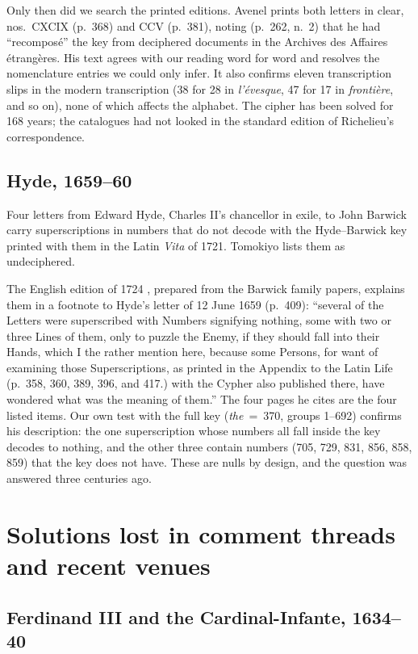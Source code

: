 \documentclass[11pt]{article}
\begin{document}
Only then did we search the printed editions. Avenel  prints both letters in clear, nos.~CXCIX (p.~368) and CCV (p.~381), noting (p.~262, n.~2) that he had ``recompos\'e'' the key from deciphered documents in the Archives des Affaires \'etrang\`eres. His text agrees with our reading word for word and resolves the nomenclature entries we could only infer. It also confirms eleven transcription slips in the modern transcription (38 for 28 in \emph{l'\'evesque}, 47 for 17 in \emph{fronti\`ere}, and so on), none of which affects the alphabet. The cipher has been solved for 168 years; the catalogues had not looked in the standard edition of Richelieu's correspondence.

\subsection{Hyde, 1659--60}

Four letters from Edward Hyde, Charles II's chancellor in exile, to John Barwick carry superscriptions in numbers that do not decode with the Hyde--Barwick key printed with them in the Latin \emph{Vita} of 1721. Tomokiyo lists them as undeciphered.

The English edition of 1724 \cite{Barwick:1724}, prepared from the Barwick family papers, explains them in a footnote to Hyde's letter of 12 June 1659 (p.~409): ``several of the Letters were superscribed with Numbers signifying nothing, some with two or three Lines of them, only to puzzle the Enemy, if they should fall into their Hands, which I the rather mention here, because some Persons, for want of examining those Superscriptions, as printed in the Appendix to the Latin Life (p.~358, 360, 389, 396, and 417.) with the Cypher also published there, have wondered what was the meaning of them.'' The four pages he cites are the four listed items. Our own test with the full key (\emph{the}~=~370, groups 1--692) confirms his description: the one superscription whose numbers all fall inside the key decodes to nothing, and the other three contain numbers (705, 729, 831, 856, 858, 859) that the key does not have. These are nulls by design, and the question was answered three centuries ago.

\section{Solutions lost in comment threads and recent venues}\label{sec:new}

\subsection{Ferdinand III and the Cardinal-Infante, 1634--40}
\end{document}
